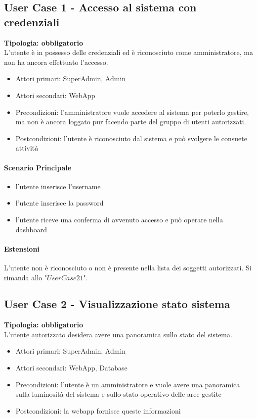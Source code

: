 \documentclass[12pt]{article}
\begin{document}
\subsection{User Case 1 - Accesso al sistema con credenziali}
\textbf{Tipologia: obbligatorio} \\
L'utente è in possesso delle credenziali ed è riconosciuto come amministratore, ma non ha ancora effettuato l'accesso.
\begin{itemize}
	\item Attori primari: SuperAdmin, Admin
	\item Attori secondari: WebApp
	\item Precondizioni: l'amministratore vuole accedere al sistema per poterlo gestire, ma non è ancora loggato pur facendo parte del gruppo di utenti autorizzati.
	\item Postcondizioni: l'utente è riconosciuto dal sistema e può svolgere le consuete attività
\end{itemize}
\paragraph{Scenario Principale}
\begin{itemize}
	\item l'utente inserisce l'username
	\item l'utente inserisce la password
	\item l'utente riceve una conferma di avvenuto accesso e può operare nella dashboard
\end{itemize}
\paragraph{Estensioni} L'utente non è riconosciuto o non è presente nella lista dei soggetti autorizzati. Si rimanda allo "$User Case 21 $".

\subsection{User Case 2 - Visualizzazione stato sistema}
\textbf{Tipologia: obbligatorio} \\
L'utente autorizzato desidera avere una panoramica sullo stato del sistema.
\begin{itemize}
	\item Attori primari: SuperAdmin, Admin
	\item Attori secondari: WebApp, Database
	\item Precondizioni: l'utente è un amministratore e vuole avere una panoramica sulla luminosità del sistema e sullo stato operativo delle aree gestite
	\item Postcondizioni: la webapp fornisce queste informazioni
\end{itemize}
\end{document}
